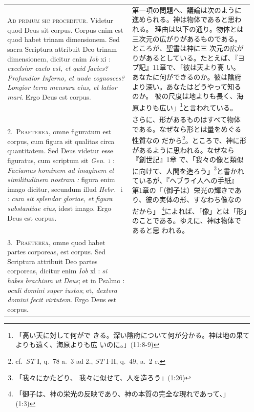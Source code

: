 \documentclass[paper=a4paper,fontsize=10pt,jafontsize=9pt,titlepage]{jlreq}
\begin{document}
\begin{longtable}{p{21em}p{21em}}


{\huge A}{\scshape d primum sic proceditur}. Videtur quod Deus sit
corpus. Corpus enim est quod habet trinam dimensionem. Sed sacra
Scriptura attribuit Deo trinam dimensionem, dicitur enim {\itshape Iob} {\sc
xi} : {\itshape excelsior caelo est, et quid facies? Profundior Inferno, et
unde cognosces? Longior terra mensura eius, et latior mari}. Ergo Deus
est corpus.

& 

第一項の問題へ、議論は次のように進められる。神は物体であると思われる。
理由は以下の通り。物体とは三次元の広がりがあるものである。ところが、聖書は神に三
次元の広がりがあるとしている。たとえば、『ヨブ記』11章で、「彼は天より高
い。あなたに何ができるのか。彼は陰府より深い。あなたはどうやって知るのか。
彼の尺度は地よりも長く、海原よりも広い」\footnote{「高い天に対して何がで
 きる。深い陰府について何が分かる。神は地の果てよりも遠く、海原よりも広
 いのに。」(11:8-9)}と言われている。

\\


2.~{\scshape Praeterea}, omne figuratum est corpus, cum figura sit qualitas
 circa quantitatem. Sed Deus videtur esse figuratus, cum scriptum sit
 {\itshape Gen}.~{\scshape i} : {\itshape Faciamus hominem ad imaginem et similitudinem
 nostram :} figura enim imago dicitur, secundum illud {\itshape Hebr}.~{\sc
 i} : {\itshape cum sit splendor gloriae, et figura substantiae eius}, idest
 imago. Ergo Deus est corpus.

&

さらに、形があるものはすべて物体である。なぜなら形とは量をめぐる性質なの
 だから\footnote{cf.~{\itshape ST} I, q.~78 a.~3 ad 2., {\itshape ST} I-II, q.~49,
 a.~2 c.}。ところで、神に形があるように思われる。なぜなら『創世記』1章
 で、「我々の像と類似に向けて、人間を造ろう」\footnote{「我々にかたどり、
 我々に似せて、人を造ろう」(1:26)}と書かれているが、『ヘブライ人への手紙』
 第1章の「（御子は）栄光の輝きであり、彼の実体の形、すなわち像なのだから」
 \footnote{「御子は、神の栄光の反映であり、神の本質の完全な現れであって、」
 (1:3)}によれば、「像」とは「形」のことである。ゆえに、神は物体であると思
 われる。

\\




3.~{\scshape Praeterea}, omne quod habet partes corporeas, est corpus. Sed
 Scriptura attribuit Deo partes corporeas, dicitur enim {\itshape Iob} {\sc
 xl} : {\itshape si habes brachium ut Deus}; et in Psalmo : {\itshape oculi domini
 super iustos}; et, {\itshape dextera domini fecit virtutem}. Ergo Deus est
 corpus.


\end{longtable}
\end{document}
